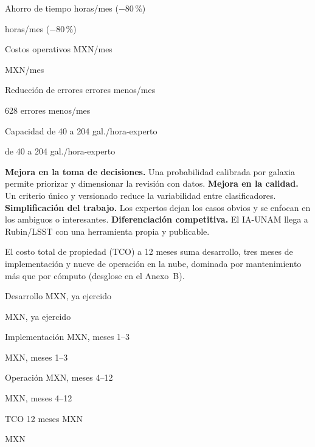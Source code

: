 \documentclass[letterpaper,11pt]{article}
\newcommand{\cifra}[5]{%
  \begingroup\setlength{\fboxsep}{5pt}%
  \colorbox{#1}{\parbox[t]{\dimexpr\linewidth-2\fboxsep\relax}{%
    \setstretch{1}\color{#2}{\Large\bfseries #3}\par
    #4%
    \ifx\relax#5\relax\else\par{\footnotesize #5}\fi}}%
  \endgroup}
\newcommand{\cifragris}[4]{\cifra{black!8}{black}{#1}{#2}{#3}}
\newcommand{\cifraacento}[4]{\cifra{blue!10}{blue!55!black}{#1}{#2}{#3}}
\begin{document}
\smallskip
\noindent
\begin{minipage}[t]{0.235\linewidth}\cifragris{$-$201\,h}{Ahorro de tiempo}{horas/mes ($-$80\,\%)}{}\end{minipage}\hfill
\begin{minipage}[t]{0.235\linewidth}\cifragris{$-$\$70.3\,mil}{Costos operativos}{MXN/mes}{}\end{minipage}\hfill
\begin{minipage}[t]{0.235\linewidth}\cifragris{$-$60\,\%}{Reducción de errores}{628 errores menos/mes}{}\end{minipage}\hfill
\begin{minipage}[t]{0.235\linewidth}\cifragris{+409\,\%}{Capacidad}{de 40 a 204 gal./hora-experto}{}\end{minipage}

\smallskip
\noindent{\footnotesize\textcolor{black!60}{Cálculo y supuestos en el Anexo~A. El ahorro supone revisar solo el 18\,\% dudoso más una auditoría del 2\,\%; los errores se comparan contra clasificar todo sin revisión.}}
\medskip

\noindent\textbf{Mejora en la toma de decisiones.} Una probabilidad calibrada por galaxia permite priorizar y dimensionar la revisión con datos.
\textbf{Mejora en la calidad.} Un criterio único y versionado reduce la variabilidad entre clasificadores.
\textbf{Simplificación del trabajo.} Los expertos dejan los casos obvios y se enfocan en los ambiguos o interesantes.
\textbf{Diferenciación competitiva.} El IA-UNAM llega a Rubin/LSST con una herramienta propia y publicable.
\medskip

El costo total de propiedad (TCO) a 12 meses suma desarrollo, tres meses de implementación y nueve de operación en la nube, dominada por mantenimiento más que por cómputo (desglose en el Anexo~B).

\smallskip
\noindent
\begin{minipage}[t]{0.235\linewidth}\cifragris{\$115.5\,mil}{Desarrollo}{MXN, ya ejercido}{}\end{minipage}\hfill
\begin{minipage}[t]{0.235\linewidth}\cifragris{\$87.0\,mil}{Implementación}{MXN, meses 1--3}{}\end{minipage}\hfill
\begin{minipage}[t]{0.235\linewidth}\cifragris{\$88.5\,mil}{Operación}{MXN, meses 4--12}{}\end{minipage}\hfill
\begin{minipage}[t]{0.235\linewidth}\cifraacento{\$291.0\,mil}{TCO 12 meses}{MXN}{}\end{minipage}
\medskip
\end{document}
